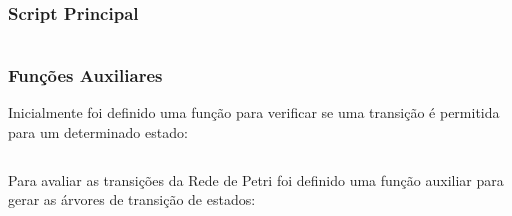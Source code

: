\documentclass[a4paper,11pt]{article}
\begin{document}
\subsubsection*{Script Principal}

\inputminted[xleftmargin=15pt,linenos,frame=single,framesep=5pt,breaklines=true]{matlab}{../matlab/petrinetproject.m}

\subsubsection*{Funções Auxiliares}

Inicialmente foi definido uma função para verificar se uma transição é permitida para um determinado estado:

\inputminted[xleftmargin=15pt,linenos,frame=single,framesep=5pt,breaklines=true]{matlab}{../matlab/petristate.m}

Para avaliar as transições da Rede de Petri foi definido uma função auxiliar para gerar as árvores de transição de estados:

\inputminted[xleftmargin=15pt,linenos,frame=single,framesep=5pt,breaklines=true]{matlab}{../matlab/dotpetree.m}

\end{document}
